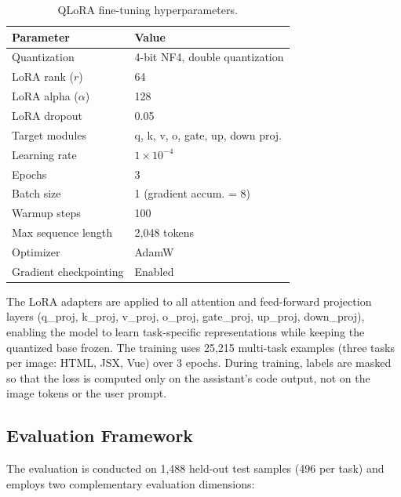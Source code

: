 \begin{table}[h]
\centering
\caption{QLoRA fine-tuning hyperparameters.}
\label{tab:qlora_config}
\begin{tabular}{ll}
\hline
\textbf{Parameter} & \textbf{Value} \\
\hline
Quantization & 4-bit NF4, double quantization \\
LoRA rank ($r$) & 64 \\
LoRA alpha ($\alpha$) & 128 \\
LoRA dropout & 0.05 \\
Target modules & q, k, v, o, gate, up, down proj. \\
Learning rate & $1 \times 10^{-4}$ \\
Epochs & 3 \\
Batch size & 1 (gradient accum. = 8) \\
Warmup steps & 100 \\
Max sequence length & 2,048 tokens \\
Optimizer & AdamW \\
Gradient checkpointing & Enabled \\
\hline
\end{tabular}
\end{table}

The LoRA adapters are applied to all attention and feed-forward projection layers (q\_proj, k\_proj, v\_proj, o\_proj, gate\_proj, up\_proj, down\_proj), enabling the model to learn task-specific representations while keeping the quantized base frozen. The training uses 25,215 multi-task examples (three tasks per image: HTML, JSX, Vue) over 3 epochs. During training, labels are masked so that the loss is computed only on the assistant's code output, not on the image tokens or the user prompt.

\subsection{Evaluation Framework}

The evaluation is conducted on 1,488 held-out test samples (496 per task) and employs two complementary evaluation dimensions:

